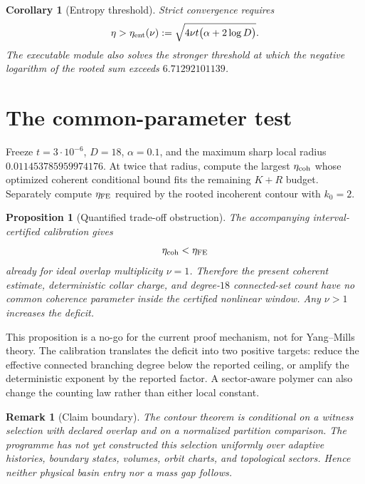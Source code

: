 \documentclass[11pt]{article}
\newtheorem{corollary}{Corollary}
\newtheorem{proposition}{Proposition}
\newtheorem{remark}{Remark}
\begin{document}
\begin{corollary}[Entropy threshold]
Strict convergence requires
\[
 \eta>\eta_{\rm ent}(\nu)
 :=\sqrt{4\nu t\bigl(\alpha+2\log D\bigr)}.
\]
The executable module also solves the stronger threshold at which the negative
logarithm of the rooted sum exceeds $6.71292101139$.
\end{corollary}

\section{The common-parameter test}

Freeze $t=3\cdot10^{-6}$, $D=18$, $\alpha=0.1$, and the maximum sharp local
radius $0.011453785959974176$.  At twice that radius, compute the largest
$\eta_{\rm coh}$ whose optimized coherent conditional bound fits the remaining
$K+R$ budget.  Separately compute $\eta_{\rm FE}$ required by the rooted
incoherent contour with $k_0=2$.

\begin{proposition}[Quantified trade-off obstruction]
The accompanying interval-certified calibration gives
\[
 \eta_{\rm coh}<\eta_{\rm FE}
\]
already for ideal overlap multiplicity $\nu=1$.  Therefore the present
coherent estimate, deterministic collar charge, and degree-$18$ connected-set
count have no common coherence parameter inside the certified nonlinear
window.  Any $\nu>1$ increases the deficit.
\end{proposition}

This proposition is a no-go for the current proof mechanism, not for
Yang--Mills theory.  The calibration translates the deficit into two positive
targets: reduce the effective connected branching degree below the reported
ceiling, or amplify the deterministic exponent by the reported factor.  A
sector-aware polymer can also change the counting law rather than either local
constant.

\begin{remark}[Claim boundary]
The contour theorem is conditional on a witness selection with declared
overlap and on a normalized partition comparison.  The programme has not yet
constructed this selection uniformly over adaptive histories, boundary states,
volumes, orbit charts, and topological sectors.  Hence neither physical basin
entry nor a mass gap follows.
\end{remark}
\end{document}
